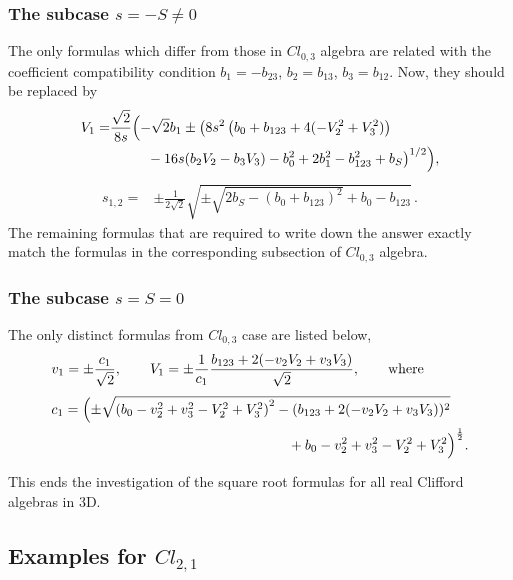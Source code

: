 \documentclass{birkjour}
\newcommand{\cl}[2]{\ensuremath{\mathit{Cl}_{#1,#2}}}
\begin{document}
\subsubsection{The subcase $s=-S\neq 0$}
The only formulas which differ from those in \cl{0}{3} algebra are
related with the coefficient compatibility condition  $b_1 =
-b_{23}$, $b_2 = b_{13}$, $ b_3= b_{12}$. Now, they should
be replaced by
\begin{equation}\begin{split}\label{Aspec2Cl21}
  V_{1}=& \frac{\sqrt{2}}{8 s}\Bigl(-\sqrt{2} b_{1}\pm \bigl(8 s^2 \left(b_{0}+b_{123}+4(-V_{2}^2+V_{3}^2)\right)\\
  &\phantom{\bigl(-8 s^2}-16 s (b_{2} V_{2}-b_{3} V_{3})-b_{0}^2+2 b_{1}^2-b_{123}^2+b_{S}\bigr)^{1/2}\Bigr),
\end{split}\end{equation}
%
\begin{equation}\begin{split}\label{solSspec1NegCl21}
s_{1,2} =& \pm\tfrac{1}{2\sqrt{2}}\sqrt{\pm\sqrt{2
b_{S}-(b_{0}+b_{123})^2}+b_{0}-b_{123}}\,.
\end{split}\end{equation}
The remaining formulas that are required to write down the
answer exactly match the formulas in the corresponding subsection
of \cl{0}{3} algebra.


\subsubsection{The subcase $s=S= 0$}
The only distinct formulas from \cl{0}{3} case are listed below,
\begin{equation}\begin{split}
&v_{1}=\pm \frac{c_1}{\sqrt{2}},\qquad
  V_{1}=\pm \frac{1}{c_1} \frac{b_{123}+2 (-v_{2} V_{2}+v_{3} V_{3})}{\sqrt{2}},\qquad \textrm{where}\quad \\[3pt]
&c_1=\Bigl(\pm\sqrt{\left(b_{0}-v_{2}^2+v_{3}^2-V_{2}^2+V_{3}^2\right)^2-
   (b_{123}+2 (-v_{2} V_{2}+v_{3} V_{3}))^2}\\
&\phantom{\frac{1}{\sqrt{2}}b_{0}-v_{2}^2-v_{3}^2  (b_{123}-2
(v_{2} V_{2}+v_{3} V_{3}))}
+b_{0}-v_{2}^2+v_{3}^2-V_{2}^2+V_{3}^2\Bigr)^{\frac{1}{2}} .
\end{split}\end{equation}
This ends the investigation of the square root formulas for all
real Clifford algebras in 3D.

\subsection{Examples for $\cl{2}{1}$}
\end{document}
